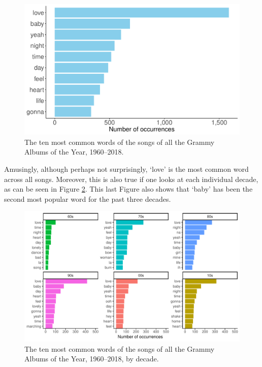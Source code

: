 \documentclass{article}
\begin{document}
\begin{figure}[h]
    \centering
    \includegraphics[scale=0.5]{Plots/graph_common_words.pdf}
    \caption{The ten most common words of the songs of all the Grammy Albums of the Year, 1960--2018.}
    \label{fig:common_words}
\end{figure}



Amusingly, although perhaps not surprisingly, `love' is the most common word across all songs. Moreover, this is also true if one looks at each individual decade, as can be seen in Figure \ref{fig:common_words_decade}. This last Figure also shows that `baby' has been the second most popular word for the past three decades.



\begin{figure}[h]
    \centering
    \includegraphics[scale=0.65]{Plots/graph_common_words_decade_FW.pdf}
    \caption{The ten most common words of the songs of all the Grammy Albums of the Year, 1960--2018, by decade.}
    \label{fig:common_words_decade}
\end{figure}
\end{document}
